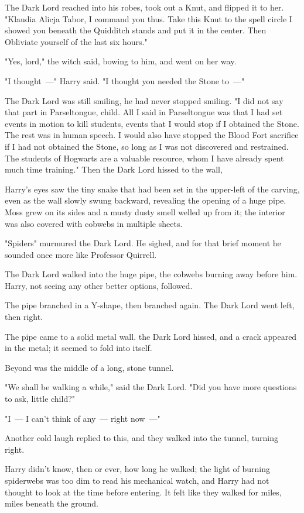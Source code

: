 The Dark Lord reached into his robes, took out a Knut, and flipped it to her.
"Klaudia Alicja Tabor, I command you thus. Take this Knut to the spell circle I
showed you beneath the Quidditch stands and put it in the center. Then
Obliviate yourself of the last six hours."

"Yes, lord," the witch said, bowing to him, and went on her way.

"I thought~---" Harry said. "I thought you needed the Stone to~---"

The Dark Lord was still smiling, he had never stopped smiling. "I did not say
that part in Parseltongue, child. All I said in Parseltongue was that I had set
events in motion to kill students, events that I would stop if I obtained the
Stone. The rest was in human speech. I would also have stopped the Blood Fort
sacrifice if I had not obtained the Stone, so long as I was not discovered and
restrained. The students of Hogwarts are a valuable resource, whom I have
already spent much time training." Then the Dark Lord hissed to the wall,

Harry's eyes saw the tiny snake that had been set in the upper-left of the
carving, even as the wall slowly swung backward, revealing the opening of a
huge pipe. Moss grew on its sides and a musty dusty smell welled up from it;
the interior was also covered with cobwebs in multiple sheets.

"Spiders{\el}" murmured the Dark Lord. He sighed, and for that brief moment
he sounded once more like Professor Quirrell.

The Dark Lord walked into the huge pipe, the cobwebs burning away before him.
Harry, not seeing any other better options, followed.

The pipe branched in a Y-shape, then branched again. The Dark Lord went left,
then right.

The pipe came to a solid metal wall.  the Dark Lord hissed, and a
crack appeared in the metal; it seemed to fold into itself.

Beyond was the middle of a long, stone tunnel.

"We shall be walking a while," said the Dark Lord. "Did you have more questions
to ask, little child?"

"I~--- I can't think of any~--- right now~---"

Another cold laugh replied to this, and they walked into the tunnel, turning
right.

Harry didn't know, then or ever, how long he walked; the light of burning
spiderwebs was too dim to read his mechanical watch, and Harry had not thought
to look at the time before entering. It felt like they walked for miles, miles
beneath the ground.

